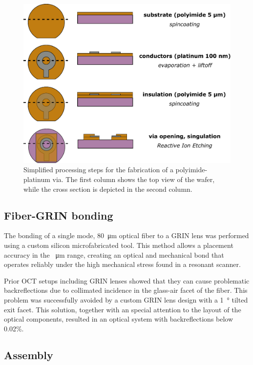 \documentclass[10pt]{iopart}
\begin{document}
\begin{figure}[h!]\centering \includegraphics[width=\columnwidth]{figures/PIprocess.pdf}
      \caption{Simplified processing steps for the fabrication of a polyimide-platinum via. The first column shows the top view of the wafer, while the cross section is depicted in the second column.}
      \label{fig:PIprocess}
\end{figure}


\subsection{Fiber-GRIN bonding}
The bonding of a single mode, \SI{80}{\micro\meter} optical fiber to a GRIN lens was performed using a custom silicon microfabricated tool. This method allows a placement accuracy in the \SI{}{\micro\meter} range, creating an optical and mechanical bond that operates reliably under the high mechanical stress found in a resonant scanner. 

Prior OCT setups including GRIN lenses showed that they can cause problematic backreflections due to collimated incidence in the glass-air facet of the fiber. This problem was successfully avoided by a custom GRIN lens design with a \SI{1}{\degree} tilted exit facet. This solution, together with an special attention to the layout of the optical components, resulted in an optical system with backreflections below 0.02\%.


\subsection{Assembly}
\end{document}
